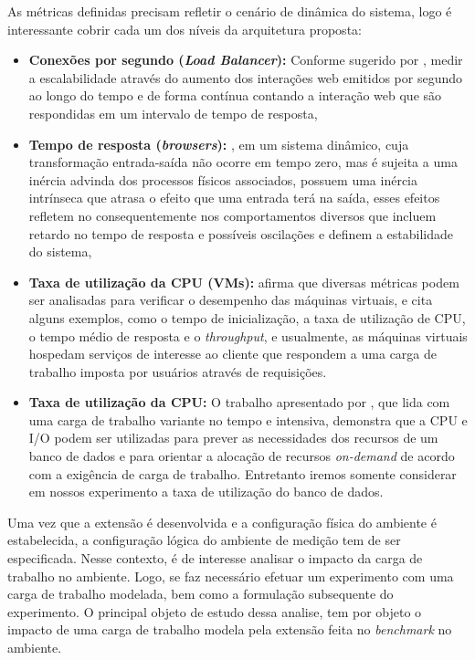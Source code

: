 As métricas definidas precisam refletir o cenário de dinâmica do sistema, logo é interessante cobrir cada um dos níveis da arquitetura proposta:
\begin{itemize}
	\item \textbf{Conexões por segundo (\textit{Load Balancer}):} Conforme sugerido por , medir a escalabilidade através do aumento dos interações web emitidos por segundo ao longo do tempo e de forma contínua contando a interação web que são respondidas em um intervalo de tempo de resposta,
	
	\item \textbf{Tempo de resposta (\textit{browsers}):} , em um sistema dinâmico, cuja transformação entrada-saída não ocorre em tempo zero, mas é sujeita a uma inércia advinda dos processos físicos associados, possuem uma inércia intrínseca que atrasa o efeito que uma entrada terá na saída, esses efeitos refletem no consequentemente nos comportamentos diversos que incluem retardo no tempo de resposta e possíveis oscilações e definem a estabilidade do sistema, 
	
	\item \textbf{Taxa de utilização da CPU (VMs):}  afirma que diversas métricas podem ser analisadas para verificar o desempenho das máquinas virtuais, e cita alguns exemplos, como o tempo de inicialização, a taxa de utilização de CPU, o tempo médio de resposta e o \textit{throughput}, e usualmente, as máquinas virtuais hospedam serviços de interesse ao cliente que respondem a uma carga de trabalho imposta por usuários através de requisições.

	\item \textbf{Taxa de utilização da CPU:} O trabalho apresentado por , que lida com uma carga de trabalho variante no tempo e intensiva, demonstra que a CPU e I/O podem ser utilizadas para prever as necessidades dos recursos de um banco de dados e para orientar a alocação de recursos \textit{on-demand} de acordo com a exigência de carga de trabalho. Entretanto iremos somente considerar em nossos experimento a taxa de utilização do banco de dados.
\end{itemize}


Uma vez que a extensão é desenvolvida e a configuração física do ambiente é estabelecida, a configuração lógica do ambiente de medição tem de ser especificada. Nesse contexto, é de interesse analisar o impacto da carga de trabalho no ambiente. Logo, se faz necessário efetuar um experimento com uma carga de trabalho modelada, bem como a formulação subsequente do experimento. 
O principal objeto de estudo dessa analise, tem por objeto o impacto de uma carga de trabalho modela pela extensão feita no \textit{benchmark} no ambiente.

